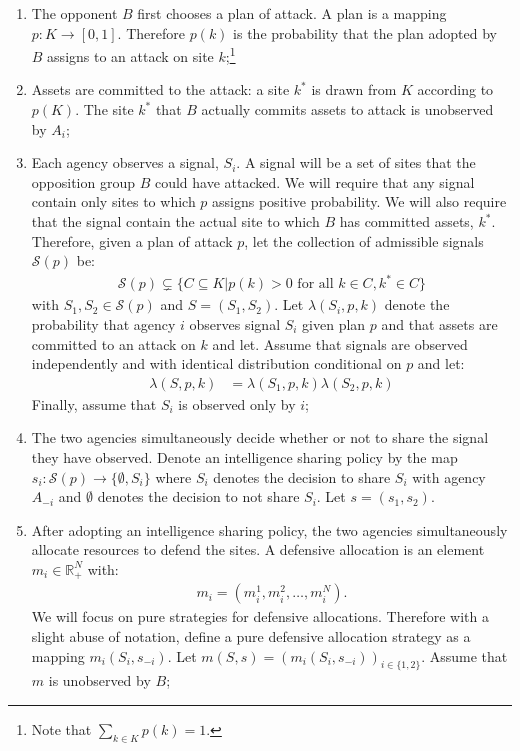 \documentclass[12pt]{article}
\begin{document}
\begin{enumerate}

\item The opponent $B$ first chooses a plan of attack.  A plan is a mapping $p:K \to [0,1]$.  Therefore $p(k)$ is the probability that the plan adopted by $B$ assigns to an attack on site $k$;\footnote{Note that $\sum_{k\in K}p(k)=1$.}

\item Assets are committed to the attack: a site $k^*$ is drawn from $K$ according to $p(K)$.  The site $k^*$ that $B$ actually commits assets to attack is unobserved by $A_i$;

\item Each agency observes a signal, $S_i$.  A signal will be a set of sites that the opposition group $B$ could have attacked.  We will require that any signal contain only sites to which $p$ assigns positive probability.  We will also require that the signal contain the actual site to which $B$ has committed assets, $k^*$.  Therefore, given a plan of attack $p$, let the collection of admissible signals $\mathcal{S}(p)$ be:
\begin{align*}
\mathcal{S}(p)\subsetneq\{C\subseteq K|p(k)>0\mbox{ for all }k\in C,k^*\in C\}
\end{align*}with $S_1,S_2\in\mathcal{S}(p)$ and $S=(S_1,S_2)$.  Let $\lambda(S_i,p,k)$ denote the probability that agency $i$ observes signal $S_i$ given plan $p$ and that assets are committed to an attack on $k$ and let.  Assume that signals are observed independently and with identical distribution conditional on $p$ and let:
\begin{align*}
\lambda(S,p,k)&=\lambda(S_1,p,k)\lambda(S_2,p,k)
\end{align*}  Finally, assume that $S_i$ is observed only by $i$;

\item The two agencies simultaneously decide whether or not to share the signal they have observed.  Denote an intelligence sharing policy by the map $s_i:\mathcal{S}(p) \to \{\emptyset,S_i\}$ where $S_i$ denotes the decision to share $S_i$ with agency $A_{-i}$ and $\emptyset$ denotes the decision to not share $S_i$.  Let $s=(s_1,s_2)$.

\item After adopting an intelligence sharing policy, the two agencies simultaneously allocate resources to defend the sites.  A defensive allocation is an element $m_i\in \mathbb{R}_+^N$ with:
\begin{align*}
m_i=(m_i^1,m_i^2,\hdots,m_i^N).
\end{align*}We will focus on pure strategies for defensive allocations.  Therefore with a slight abuse of notation, define a pure defensive allocation strategy as a mapping $m_i(S_i,s_{-i})$.  Let $m(S,s)=(m_i(S_i,s_{-i}))_{i\in\{1,2\}}$.  Assume that $m$ is unobserved by $B$;


\end{enumerate}
\end{document}
